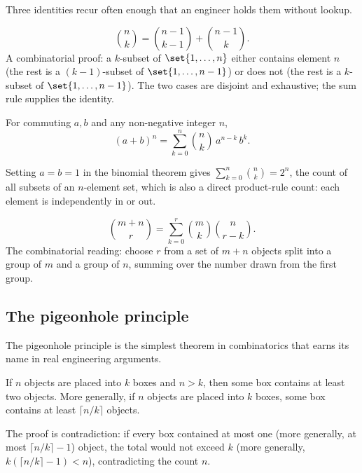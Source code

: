 Three identities recur often enough that an engineer holds them
without lookup.

\begin{principle}
\[
\binom{n}{k} = \binom{n-1}{k-1} + \binom{n-1}{k}.
\]
A combinatorial proof: a $k$-subset of $\set{1, \ldots, n}$ either
contains element $n$ (the rest is a $(k-1)$-subset of $\set{1,
\ldots, n-1}$) or does not (the rest is a $k$-subset of $\set{1,
\ldots, n-1}$). The two cases are disjoint and exhaustive; the sum
rule supplies the identity.
\end{principle}

\begin{principle}
For commuting $a, b$ and any non-negative integer $n$,
\[
(a + b)^{n} = \sum_{k=0}^{n} \binom{n}{k}\, a^{n-k}\, b^{k}.
\]
\end{principle}

Setting $a = b = 1$ in the binomial theorem gives $\sum_{k=0}^{n}
\binom{n}{k} = 2^{n}$, the count of all subsets of an $n$-element
set, which is also a direct product-rule count: each element is
independently in or out.

\begin{principle}
\[
\binom{m+n}{r} = \sum_{k=0}^{r} \binom{m}{k}\binom{n}{r-k}.
\]
The combinatorial reading: choose $r$ from a set of $m+n$ objects
split into a group of $m$ and a group of $n$, summing over the
number drawn from the first group.
\end{principle}

\subsection{The pigeonhole principle}

The pigeonhole principle is the simplest theorem in combinatorics
that earns its name in real engineering arguments.

\begin{principle}[Pigeonhole]
If $n$ objects are placed into $k$ boxes and $n > k$, then some box
contains at least two objects. More generally, if $n$ objects are
placed into $k$ boxes, some box contains at least $\lceil n/k \rceil$
objects.
\end{principle}

The proof is contradiction: if every box contained at most one
(more generally, at most $\lceil n/k \rceil - 1$) object, the total
would not exceed $k$ (more generally, $k(\lceil n/k \rceil - 1) < n$),
contradicting the count $n$.

